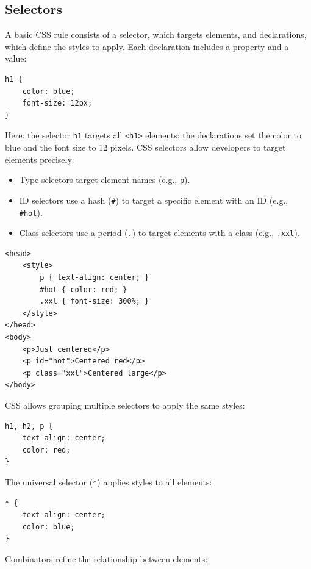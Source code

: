 \subsection*{Selectors}
A basic CSS rule consists of a selector, which targets elements, and declarations, which define the styles to apply. Each declaration includes a property and a value:
\begin{verbatim}
h1 {
    color: blue;
    font-size: 12px;
}
\end{verbatim}
Here: the selector \texttt{h1} targets all \texttt{<h1>} elements; the declarations set the color to blue and the font size to 12 pixels. CSS selectors allow developers to target elements precisely:
\begin{itemize}
    \item Type selectors target element names (e.g., \texttt{p}).
    \item ID selectors use a hash (\texttt{\#}) to target a specific element with an ID (e.g., \texttt{\#hot}).
    \item Class selectors use a period (\texttt{.}) to target elements with a class (e.g., \texttt{.xxl}).
\end{itemize}
\begin{verbatim}
<head>
    <style>
        p { text-align: center; }
        #hot { color: red; }
        .xxl { font-size: 300%; }
    </style>
</head>
<body>
    <p>Just centered</p>
    <p id="hot">Centered red</p>
    <p class="xxl">Centered large</p>
</body>
\end{verbatim}
CSS allows grouping multiple selectors to apply the same styles:
\begin{verbatim}
h1, h2, p {
    text-align: center;
    color: red;
}
\end{verbatim}
The universal selector (\texttt{*}) applies styles to all elements:
\begin{verbatim}
* {
    text-align: center;
    color: blue;
}
\end{verbatim}
Combinators refine the relationship between elements:
